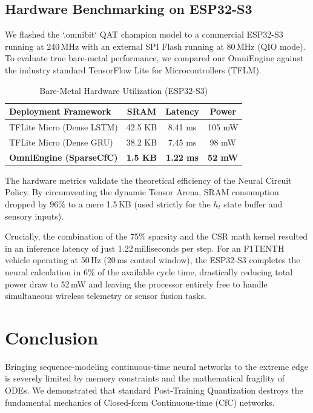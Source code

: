 \documentclass[lettersize,journal]{IEEEtran}
\begin{document}
\subsection{Hardware Benchmarking on ESP32-S3}
We flashed the `.omnibit` QAT champion model to a commercial ESP32-S3 running at 240\,MHz with an external SPI Flash running at 80\,MHz (QIO mode). To evaluate true bare-metal performance, we compared our OmniEngine against the industry standard TensorFlow Lite for Microcontrollers (TFLM).

\begin{table}[!ht]
\caption{Bare-Metal Hardware Utilization (ESP32-S3)}
\centering
\begin{tabular}{@{}l c c c@{}}
\toprule
\textbf{Deployment Framework} & \textbf{SRAM} & \textbf{Latency} & \textbf{Power} \\
\midrule
TFLite Micro (Dense LSTM)  & 42.5 KB        & 8.41 ms        & 105 mW \\
TFLite Micro (Dense GRU)   & 38.2 KB        & 7.45 ms        & 98 mW \\
\textbf{OmniEngine (SparseCfC)} & \textbf{1.5 KB} & \textbf{1.22 ms} & \textbf{52 mW} \\
\bottomrule
\end{tabular}
\end{table}

The hardware metrics validate the theoretical efficiency of the Neural Circuit Policy. By circumventing the dynamic Tensor Arena, SRAM consumption dropped by $96\%$ to a mere 1.5\,KB (used strictly for the $h_t$ state buffer and sensory inputs). 

Crucially, the combination of the 75\% sparsity and the CSR math kernel resulted in an inference latency of just 1.22\,milliseconds per step. For an F1TENTH vehicle operating at 50\,Hz (20\,ms control window), the ESP32-S3 completes the neural calculation in $6\%$ of the available cycle time, drastically reducing total power draw to 52\,mW and leaving the processor entirely free to handle simultaneous wireless telemetry or sensor fusion tasks.

\section{Conclusion}
Bringing sequence-modeling continuous-time neural networks to the extreme edge is severely limited by memory constraints and the mathematical fragility of ODEs. We demonstrated that standard Post-Training Quantization destroys the fundamental mechanics of Closed-form Continuous-time (CfC) networks.
\end{document}
